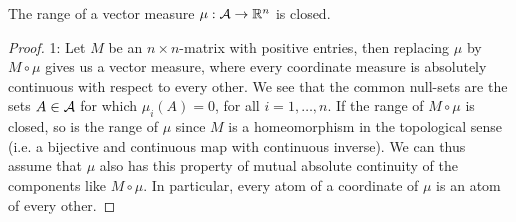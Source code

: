 \begin{theorem}[Lyapunov, 1940]\label{thm: Liapunoff closed}
The range of a vector measure $\mu:\mathcal{A}\to \mathbb{R}^{n}$ is closed.
\end{theorem}
\begin{proof}
1: Let $M$ be an $n\times n$-matrix with positive entries, then replacing $\mu$ by $M\circ \mu$ gives us a vector measure, where every coordinate measure is absolutely continuous with respect to every other. We see that the common null-sets are the sets $A\in \mathcal{A}$ for which $\mu_{i}(A)=0$, for all $i=1, \dots, n$. If the range of $M\circ \mu$ is closed, so is the range of $\mu$ since $M$ is a homeomorphism in the topological sense (i.e. a bijective and continuous map with continuous inverse).
We can thus assume that $\mu$ also has this property of mutual absolute continuity of the components like $M\circ \mu$. In particular, every atom of a coordinate of $\mu$ is an atom of every other.


\end{proof}

